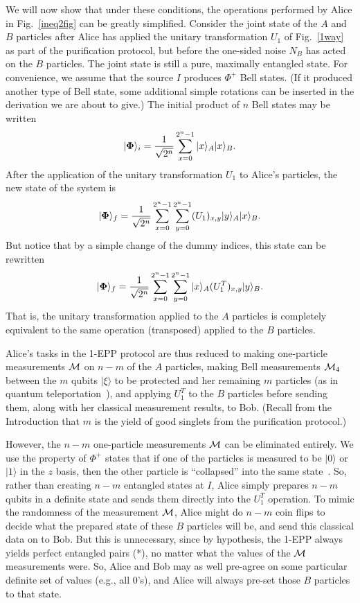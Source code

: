 We will now show that under these conditions, the operations performed
by Alice in Fig.~\ref{ineq2fig} can be greatly simplified.  Consider
the joint state of the $A$ and $B$ particles
after Alice has applied the unitary
transformation $U_1$ of Fig.~\ref{1way} as part of the purification 
protocol, but before
the one-sided noise $N_B$ has acted on the $B$ particles.  The joint state is
still a pure, maximally entangled state.  For convenience, we assume
that the source $I$ produces $\Phi^+$
Bell states.  (If it produced another type of Bell state, some
additional simple rotations can be inserted in the derivation we are
about to give.)  The initial product of $n$ Bell states may
be written
\begin{equation}
|{\bf \Phi}\rangle_i=\frac{1}{\sqrt{2^n}}\sum_{x=0}^{2^n-1}|x\rangle_A
|x\rangle_B.
\end{equation}
After the application of the unitary transformation $U_1$ to Alice's
particles, the new state of the system is
\begin{equation}
|{\bf \Phi}\rangle_f=\frac{1}{\sqrt{2^n}}\sum_{x=0}^{2^n-1}
\sum_{y=0}^{2^n-1}(U_1)_{x,y}|y\rangle_A|x\rangle_B.
\end{equation}
But notice that by a simple change of the dummy indices, this state
can be rewritten
\begin{equation}
|{\bf \Phi}\rangle_f=\frac{1}{\sqrt{2^n}}\sum_{x=0}^{2^n-1}
\sum_{y=0}^{2^n-1}|x\rangle_A(U_1^T)_{x,y}|y\rangle_B.
\end{equation}
That is, the unitary transformation applied to the $A$ particles is
completely equivalent to the same operation (transposed) applied to
the $B$ particles.
 
Alice's tasks in the 1-EPP protocol are thus reduced to making
one-particle measurements $\cal M$ on $n\!-\!m$ of the $A$
particles, making Bell measurements ${\cal M}_4$ between the $m$
qubits $|\xi\rangle$ to be protected and her remaining $m$ particles
(as in quantum teleportation~\cite{teleportation}), and applying
$U_1^T$ to the $B$ particles before sending them, along with her
classical measurement results, to Bob.  (Recall from the Introduction
that $m$ is the yield of good singlets from the purification
protocol.)  
 
However, the $n\!-\!m$ one-particle measurements
$\cal M$ can be eliminated entirely.  We use the
property of $\Phi^+$ states that if one of the particles is
measured to be $|0\rangle$ or $|1\rangle$ in the $z$ basis, 
then the other particle is ``collapsed'' into the same
state~\cite{EPR,Bell}.  So, rather than creating $n\!-\!m$ entangled states
at $I$, Alice simply prepares $n\!-\!m$ qubits in a definite state and
sends them directly into the $U_1^T$ operation.  To mimic the
randomness of the measurement $\cal M$, Alice might do $n\!-\!m$
coin flips to decide what the prepared state of these $B$ particles
will be, and send this classical data on to Bob.  But this is
unnecessary, since by hypothesis, the 1-EPP always yields perfect
entangled pairs (*), no matter what the values of the $\cal M$ 
measurements were.  So, Alice and Bob may as well pre-agree on some
particular definite set of values (e.g., all 0's), and Alice will
always pre-set those $B$ particles to that state.\cite{footas}
 
